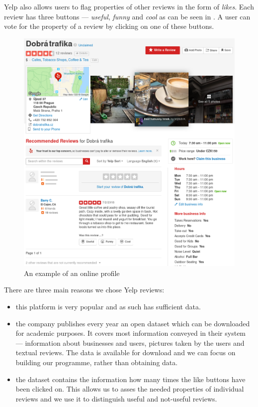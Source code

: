 Yelp also allows users to flag properties of other reviews in the form of \emph{likes}.
Each review has three buttons --- \emph{useful}, \emph{funny} and \emph{cool} as can be seen in .
A user can vote for the property of a review by clicking on one of these buttons.

\begin{figure}[ht]\centering
\includegraphics[width=130mm]{../img/dobra_trafika.png}
\caption{An example of an online profile}
\label{fig:dobra_trafika}
\end{figure}

There are three main reasons we chose Yelp reviews: 

\begin{itemize}
\item this platform is very popular and as such has sufficient data.

\item the company publishes every year an open dataset which can be downloaded for academic
purposes.
It covers most information conveyed in their system ---  information about businesses and users, pictures taken by the users and textual reviews.
The data is available for download and we can focus on building our programme, rather than obtaining data.

\item  the dataset contains the information how many times the like buttons have been clicked on.
This allows us to asses the needed properties of individual reviews and
we use it to distinguish useful and not-useful reviews.
\end{itemize}

